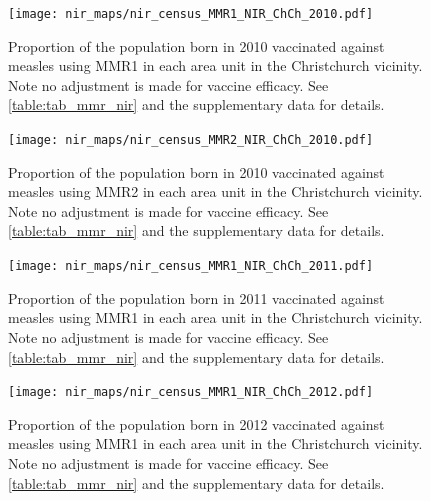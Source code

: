 \documentclass{article}
\begin{document}
\begin{figure}
\begin{center}
    \texttt{[image: nir\_maps/nir\_census\_MMR1\_NIR\_ChCh\_2010.pdf]}
\end{center}
    \caption{Proportion of the population born in 2010 vaccinated against measles using MMR1 in each area unit in the Christchurch vicinity. Note no adjustment is made for vaccine efficacy. See \autoref{table:tab_mmr_nir} and the supplementary data for details.}
\label{fig:fig12010_c}
\end{figure}


\begin{figure}
\begin{center}
    \texttt{[image: nir\_maps/nir\_census\_MMR2\_NIR\_ChCh\_2010.pdf]}
 \end{center}
    \caption{Proportion of the population born in 2010 vaccinated against measles using MMR2 in each area unit in the Christchurch vicinity. Note no adjustment is made for vaccine efficacy. See \autoref{table:tab_mmr_nir} and the supplementary data for details.}
\label{fig:fig22010_c}
\end{figure}


\begin{figure}
\begin{center}
    \texttt{[image: nir\_maps/nir\_census\_MMR1\_NIR\_ChCh\_2011.pdf]}
 \end{center}
    \caption{Proportion of the population born in 2011 vaccinated against measles using MMR1 in each area unit in the Christchurch vicinity. Note no adjustment is made for vaccine efficacy. See \autoref{table:tab_mmr_nir} and the supplementary data for details.}
\label{fig:fig12011_c}
\end{figure}


\begin{figure}
\begin{center}
    \texttt{[image: nir\_maps/nir\_census\_MMR1\_NIR\_ChCh\_2012.pdf]}
 \end{center}
    \caption{Proportion of the population born in 2012 vaccinated against measles using MMR1 in each area unit in the Christchurch vicinity. Note no adjustment is made for vaccine efficacy. See \autoref{table:tab_mmr_nir} and the supplementary data for details.}
\label{fig:fig12012_c}
\end{figure}
\end{document}

